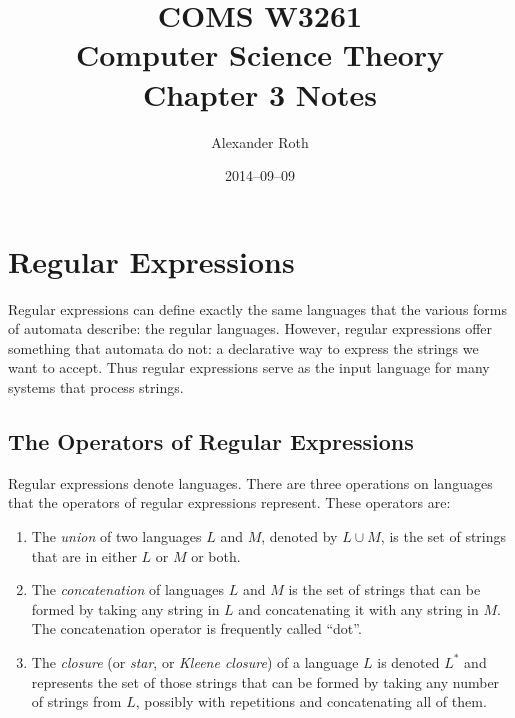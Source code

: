 \documentclass[]{article}
\begin{document}
\title{COMS W3261 \\ Computer Science Theory \\ Chapter 3 Notes}
\author{Alexander Roth}
\date{2014--09--09}
\maketitle
\newtheorem{thm}{Theorem}

\section*{Regular Expressions}
  Regular expressions can define exactly the same languages that the various
  forms of automata describe: the regular languages. However, regular
  expressions offer something that automata do not: a declarative way to express
  the strings we want to accept. Thus regular expressions serve as the input
  language for many systems that process strings.

  \subsection*{The Operators of Regular Expressions}
    Regular expressions denote languages. There are three operations on
    languages that the operators of regular expressions represent. These
    operators are:
    \begin{enumerate}
      \item The \emph{union} of two languages $L$ and $M$, denoted by
      $L \cup M$, is the set of strings that are in either $L$ or $M$ or both.
      \item The \emph{concatenation} of languages $L$ and $M$ is the set of
      strings that can be formed by taking any string in $L$ and concatenating
      it with any string in $M$. The concatenation operator is frequently called
      ``dot''.
      \item The \emph{closure} (or \emph{star}, or \emph{Kleene closure}) of a
      language $L$ is denoted $L^*$ and represents the set of those strings that
      can be formed by taking any number of strings from $L$, possibly with
      repetitions and concatenating all of them.
    \end{enumerate}
\end{document}
